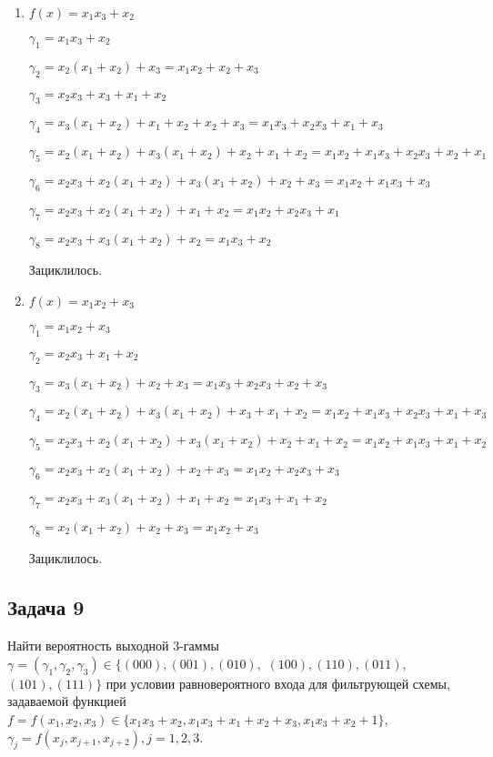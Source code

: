 \documentclass[12pt]{extarticle}
\begin{document}
\begin{enumerate}
    \item $f(x)=x_1 x_3 + x_2$
    
    $\gamma_1= x_1 x_3 +x_2$
    
    $\gamma_2 = x_2 (x_1 + x_2) + x_3 = x_1 x_2 + x_2 + x_3$
    
    $\gamma_3 = x_2 x_3 + x_3 + x_1 + x_2$
    
    $\gamma_4 = x_3 (x_1 + x_2) + x_1 + x_2 + x_2 + x_3 = x_1 x_3 + x_2 x_3 + x_1 + x_3$
    
    $\gamma_5 = x_2 (x_1 + x_2) + x_3 (x_1 + x_2) + x_2 + x_1 + x_2 = x_1 x_2 + x_1 x_3 + x_2 x_3 + x_2 +x_1$
    
    $\gamma_6 = x_2 x_3 + x_2 (x_1 + x_2) + x_3 (x_1 + x_2) + x_2 + x_3 = x_1 x_2 + x_1 x_3 + x_3$
    
    $\gamma_7 = x_2 x_3 + x_2 (x_1 + x_2) + x_1 + x_2 = x_1 x_2 + x_2 x_3 + x_1$
    
    $\gamma_8 = x_2 x_3 + x_3 (x_1 + x_2) + x_2 = x_1 x_3 + x_2$
    
    Зациклилось.
    
    
    \item $f(x)=x_1 x_2 + x_3$
    
    $\gamma_1 = x_1 x_2 + x_3$
    
    $\gamma_2 = x_2 x_3 + x_1 + x_2$
    
    $\gamma_3 = x_3 (x_1 + x_2) + x_2 + x_3 = x_1 x_3 + x_2 x_3 + x_2 + x_3$
    
    $\gamma_4 = x_2 (x_1 + x_2) + x_3 (x_1 + x_2) + x_3 + x_1 + x_2 = x_1 x_2 + x_1 x_3 + x_2 x_3 + x_1 + x_3$
    
    $\gamma_5 = x_2 x_3 + x_2 (x_1 + x_2) + x_3 (x_1 + x_2) +x_2 + x_1 + x_2 = x_1 x_2 + x_1 x_3 + x_1 + x_2$
    
    $\gamma_6 = x_2 x_3 + x_2 (x_1 + x_2) + x_2 + x_3 = x_1 x_2 + x_2 x_3 + x_3$
    
    $\gamma_7 = x_2 x_3 + x_3 (x_1 + x_2) + x_1 + x_2 = x_1 x_3 + x_1 + x_2$
    
    $\gamma_8 = x_2 (x_1 + x_2) + x_2 + x_3 = x_1 x_2 + x_3$
    
    Зациклилось.
\end{enumerate}


\subsection{Задача 9}
Найти вероятность выходной 3-гаммы $\gamma = (\gamma_1,\gamma_2,\gamma_3) \in \{ (000), (001), (010),$ $ (100), (110), (011),$ $(101), (111) \}$ при условии равновероятного входа для фильтрующей схемы, задаваемой функцией $f=f(x_1,x_2,x_3)\in \{x_1 x_3+x_2, x_1 x_3+x_1+x_2+x_3, x_1 x_3+x_2+1\}$, $\gamma_j = f(x_j, x_{j+1}, x_{j+2}), j=1,2,3$.
\end{document}
